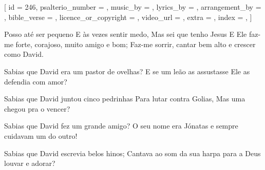 
[
    id                     = {246},
    psalterio_number       = {},
    music_by               = {},
    lyrics_by              = {},
    arrangement_by         = {},
    bible_verse            = {},
    licence_or_copyright   = {},
    video_url              = {},
    extra                  = {},
    index                  = {},
]


\beginchorus

Posso até ser pequeno
E às vezes sentir medo,
Mas sei que tenho Jesus
E Ele faz-me forte, corajoso, 
muito amigo e bom; 
Faz-me sorrir, 
cantar bem alto e crescer como David.

\endchorus


\beginverse

Sabias que David era um pastor de ovelhas? 
E se um leão as assustasse
Ele as defendia com amor?

\endverse


\beginverse

Sabias que David juntou cinco pedrinhas 
Para lutar contra Golias,
Mas uma chegou pra o vencer?

\endverse


\beginverse

Sabias que David fez um grande amigo? 
O seu nome era Jónatas
e sempre cuidavam um do outro!

\endverse



\beginverse

Sabias que David escrevia belos hinos; 
Cantava ao som da sua harpa
para a Deus louvar e adorar?

\endverse


\endsong
